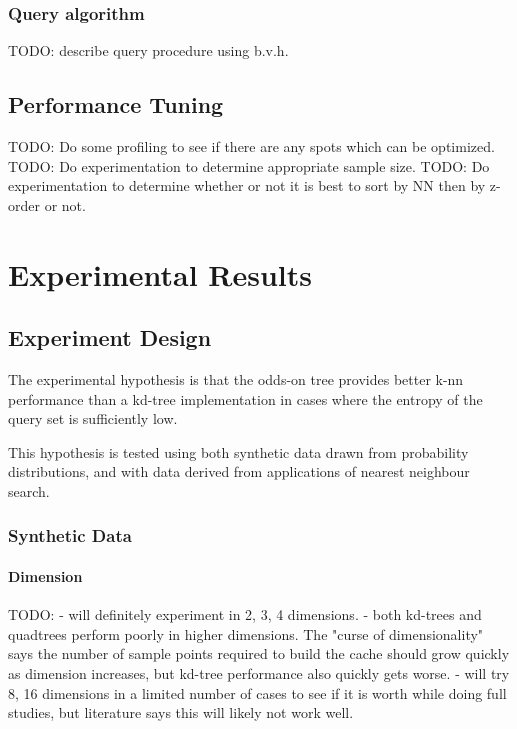 \documentclass[mcs]{scsthesis}
\begin{document}
\subsection{Query algorithm}

TODO: describe query procedure using b.v.h.

\section{Performance Tuning}

TODO: Do some profiling to see if there are any spots which can be optimized. 
TODO: Do experimentation to determine appropriate sample size.
TODO: Do experimentation to determine whether or not it is best to sort by NN
      then by z-order or not.

\chapter{Experimental Results}


\section{Experiment Design}

The experimental hypothesis is that the odds-on tree provides better k-nn
performance than a kd-tree implementation in cases where the entropy of the
query set is sufficiently low.

This hypothesis is tested using both synthetic data drawn from probability
distributions, and with data derived from applications of nearest neighbour
search. 

\subsection{Synthetic Data}

\subsubsection{Dimension}

TODO:
- will definitely experiment in 2, 3, 4 dimensions.
- both kd-trees and quadtrees perform poorly in higher dimensions.  The "curse
of dimensionality" says the number of sample points required to build the cache
should grow quickly as dimension increases, but kd-tree performance also quickly
gets worse.
- will try 8, 16 dimensions in a limited number of cases to see if it is worth
while doing full studies, but literature says this will likely not work well.
\end{document}
